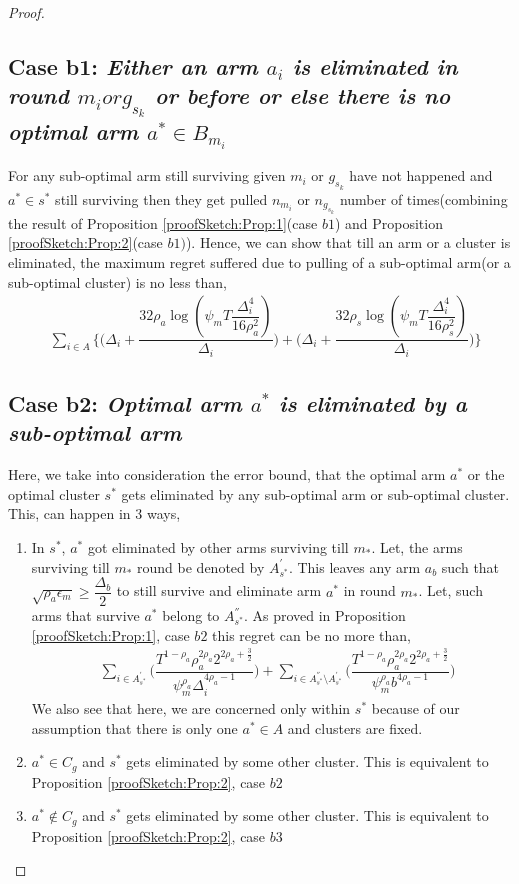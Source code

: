 \begin{proof}
\subsection*{Case b1: \textit{Either an arm $a_{i}$ is eliminated in round $m_{i} or g_{s_{k}}$ or before or else there is no optimal arm $a^{*}\in B_{m_{i}}$}} 
 
	For any sub-optimal arm still surviving given $m_{i}$ or $g_{s_{k}}$ have not happened and $a^{*}\in s^{*}$ still surviving then they get pulled $n_{m_{i}}$ or $n_{g_{s_{k}}}$ number of times(combining the result of Proposition \ref{proofSketch:Prop:1}(case $b1$) and Proposition \ref{proofSketch:Prop:2}(case $b1)$). Hence, we can show that till an arm or a cluster is eliminated, the maximum regret suffered due to pulling of a sub-optimal arm(or a sub-optimal cluster) is no less than,
 \begin{align*}
 &\sum_{i\in A}\bigg\lbrace\bigg(\Delta_{i}+\dfrac{32\rho_{a}\log{(\psi_{m}T\dfrac{\Delta_{i}^{4}}{16\rho_{a}^{2}})}}{\Delta_{i}}\bigg) + \bigg(\Delta_{i}+\dfrac{32\rho_{s}\log{(\psi_{m}T\dfrac{\Delta_{i}^{4}}{16\rho_{s}^{2}})}}{\Delta_{i}}\bigg)\bigg\rbrace 
 \end{align*}

 
\subsection*{Case b2: \textit{Optimal arm $a^{*}$ is eliminated by a sub-optimal arm}}
  
	Here, we take into consideration the error bound, that the optimal arm $a^{*}$ or the optimal cluster $s^{*}$ gets eliminated by any sub-optimal arm or sub-optimal cluster. This, can happen in $3$ ways,
\begin{enumerate}
\item In $s^{*}$, $a^{*}$ got eliminated by other arms surviving till $m_{*}$. Let, the arms surviving till $m_{*}$ round be denoted by $A^{'}_{s^{*}}$. This leaves any arm $a_{b}$ such that $\sqrt{\rho_{a}\epsilon_{m}}\geq\dfrac{\Delta_{b}}{2}$ to still survive and eliminate arm $a^{*}$ in round $m_{*}$. Let, such arms that survive $a^{*}$ belong to $A^{''}_{s^{*}}$. As proved in Proposition \ref{proofSketch:Prop:1}, case $b2$ this regret can be no more than,
 \begin{align*}
 &\sum_{i\in A^{'}_{s^{*}}}\bigg(\dfrac{T^{1-\rho_{a}}\rho_{a}^{2\rho_{a}}2^{2\rho_{a}+\frac{3}{2}}}{\psi_{m}^{\rho_{a}}\Delta_{i}^{4\rho_{a} -1}} \bigg)+\sum_{i\in A^{''}_{s^{*}}\setminus A^{'}_{s^{*}}}\bigg(\dfrac{T^{1-\rho_{a}}\rho_{a}^{2\rho_{a}}2^{2\rho_{a}+\frac{3}{2}}}{\psi_{m}^{\rho_{a}}b^{4\rho_{a} -1}} \bigg)
 \end{align*}
We also see that here, we are concerned only within $s^{*}$ because of our assumption that there is only one $a^{*}\in A$ and clusters are fixed.
\item $a^{*}\in C_{g}$ and $s^{*}$ gets eliminated by some other cluster. This is equivalent to Proposition \ref{proofSketch:Prop:2}, case $b2$
\item $a^{*}\notin C_{g}$ and $s^{*}$ gets eliminated by some other cluster. This is equivalent to Proposition \ref{proofSketch:Prop:2}, case $b3$
\end{enumerate} 



\end{proof}
